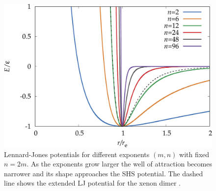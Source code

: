 \begin{figure}\centering
    \includegraphics[width=0.8\columnwidth]{kslj/exampleLJ.pdf}
    \caption{Lennard-Jones potentials for different exponents $(m,n)$ with
    fixed $n=2m$. As the exponents grow larger the well of attraction becomes narrower 
    and its shape approaches the \acs{SHS} potential. The dashed line
    shows the extended LJ potential for the xenon dimer \autocite{Jerabek_relativisticcoupledclusterinteraction_2017}.}
    \label{fig:LJ}
\end{figure}

